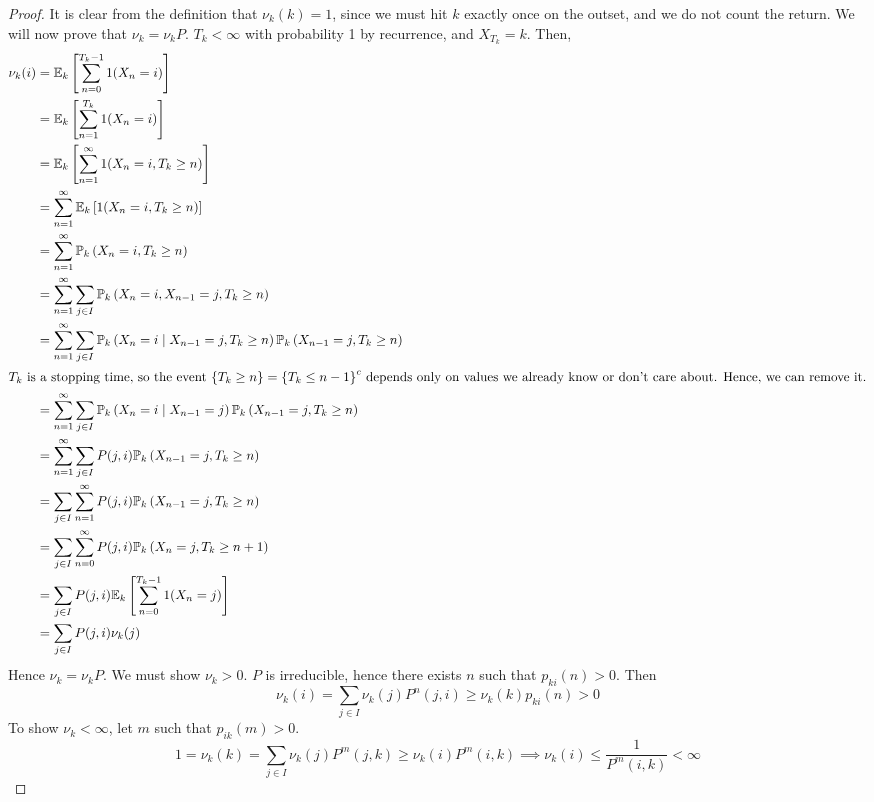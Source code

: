 \begin{proof}
	It is clear from the definition that \( \nu_k(k) = 1 \), since we must hit \( k \) exactly once on the outset, and we do not count the return.
	We will now prove that \( \nu_k = \nu_k P \).
	\( T_k < \infty \) with probability 1 by recurrence, and \( X_{T_k} = k \).
	Then,
	\begin{align*}
		\nu_k(i) & = \mathbb{E}_{k}\left[{\sum_{n=0}^{T_k - 1} 1(X_n = i)}\right]                                                                         \\
		         & = \mathbb{E}_{k}\left[{\sum_{n=1}^{T_k} 1(X_n = i)}\right]                                                                             \\
		         & = \mathbb{E}_{k}\left[{\sum_{n=1}^\infty 1(X_n = i, T_k \geq n)}\right]                                                                \\
		         & = \sum_{n=1}^\infty \mathbb{E}_{k}\left[{1(X_n = i, T_k \geq n)}\right]                                                                \\
		         & = \sum_{n=1}^\infty \mathbb{P}_{k}\left({X_n = i, T_k \geq n}\right)                                                                   \\
		         & = \sum_{n=1}^\infty \sum_{j \in I} \mathbb{P}_{k}\left({X_n = i, X_{n-1} = j, T_k \geq n}\right)                                       \\
		         & = \sum_{n=1}^\infty \sum_{j \in I} \mathbb{P}_{k}\left({X_n = i \mid X_{n-1} = j, T_k \geq n}\right) \mathbb{P}_{k}\left({X_{n-1} = j, T_k \geq n}\right) \\
		\intertext{\( T_k \) is a stopping time, so the event \( \qty{T_k \geq n} = {\qty{T_k \leq n-1}}^c \) depends only on values we already know or don't care about.
			Hence, we can remove it.}
		         & = \sum_{n=1}^\infty \sum_{j \in I} \mathbb{P}_{k}\left({X_n = i \mid X_{n-1} = j}\right) \mathbb{P}_{k}\left({X_{n-1} = j, T_k \geq n}\right)             \\
		         & = \sum_{n=1}^\infty \sum_{j \in I} P(j, i) \mathbb{P}_{k}\left({X_{n-1} = j, T_k \geq n}\right)                                        \\
		         & = \sum_{j \in I} \sum_{n=1}^\infty P(j, i) \mathbb{P}_{k}\left({X_{n-1} = j, T_k \geq n}\right)                                        \\
		         & = \sum_{j \in I} \sum_{n=0}^\infty P(j, i) \mathbb{P}_{k}\left({X_n = j, T_k \geq n + 1}\right)                                        \\
		         & = \sum_{j \in I} P(j, i) \mathbb{E}_{k}\left[{\sum_{n=0}^{T_k - 1} 1(X_n = j)}\right]                                                  \\
		         & = \sum_{j \in I} P(j, i) \nu_k(j)
	\end{align*}
	Hence \( \nu_k = \nu_k P \).
	We must show \( \nu_k > 0 \).
	\( P \) is irreducible, hence there exists \( n \) such that \( p_{ki}(n) > 0 \).
	Then
	\[
		\nu_k(i) = \sum_{j \in I} \nu_k(j) P^n(j,i) \geq \nu_k(k) p_{ki}(n) > 0
	\]
	To show \( \nu_k < \infty \), let \( m \) such that \( p_{ik}(m) > 0 \).
	\[
		1 = \nu_k(k) = \sum_{j \in I} \nu_k(j) P^m(j,k) \geq \nu_k(i) P^m(i,k) \implies \nu_k(i) \leq \frac{1}{P^m(i,k)} < \infty
	\]
\end{proof}

